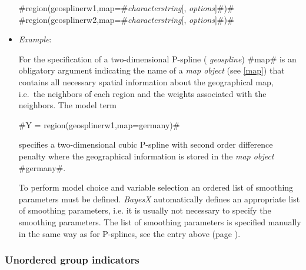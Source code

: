 \begin{itemize}
#region(geosplinerw1,map=#{\em characterstring}[, {\em options}]#)# \\
#region(geosplinerw2,map=#{\em characterstring}[, {\em options}]#)#
\item[] {\em Example}:

For the specification of a two-dimensional P-spline ({\em
geospline}) #map# is an obligatory argument indicating the name of
a {\em map object} (see \autoref{map}) that contains all necessary
spatial information about the geographical map, i.e.~the neighbors
of each region and the weights associated with the neighbors. The
model term

#Y = region(geosplinerw1,map=germany)#

specifies a two-dimensional cubic P-spline with second order difference
penalty where the geographical information is stored in the
{\em map object} #germany#.

To perform model choice and variable selection an ordered list of smoothing parameters must be defined. {\em BayesX} automatically defines an appropriate list of smoothing
parameters, i.e. it is usually not necessary to  specify the smoothing parameters. The list of smoothing parameters is
specified manually in the same way as for P-splines, see the entry above (page \pageref{psplines_stepwise}).
\end{itemize}

\subsubsection*{Unordered group indicators}

